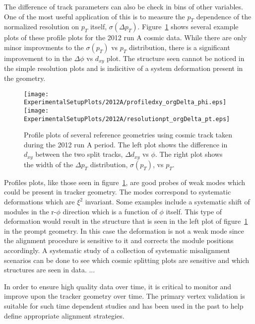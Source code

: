 The difference of track parameters can also be check in bins of other
variables.  One of the most useful application of this is to measure
the $p_T$ dependence of the normalized resolution on $p_T$ itself, 
$\sigma(\Delta p_T)$. Figure~\ref{fig:trackSplittingProfiles} shows 
several example plots of these profile plots for the 2012 run A cosmic 
data.  While there are only minor improvments to the $\sigma(p_T)$ vs
$p_T$ distribution, there is a significant improvement to in the $\Delta\phi$
vs $d_{xy}$ plot.  The structure seen cannot be noticed in the simple
resolution plots and is indicitive of a system deformation present in
the geometry.  

\begin{figure}
\begin{center}
\texttt{[image: ExperimentalSetupPlots/2012A/profiledxy\_orgDelta\_phi.eps]}
\texttt{[image: ExperimentalSetupPlots/2012A/resolutionpt\_orgDelta\_pt.eps]}
\label{fig:trackSplittingProfiles}
\caption{Profile plots of several reference geometries using cosmic track
taken during the 2012 run A period.  The left plot shows the difference 
in $d_{xy}$ between the two split tracks, $\Delta d_{xy}$ vs $\phi$.  The 
right plot shows the width of the $\Delta p_T$ distribution, $\sigma(p_T)$, 
vs $p_T$.}
\end{center}
\end{figure}

Profiles plots, like those seen in figure~\ref{fig:trackSplittingProfiles}, 
are good probes of weak modes which could be present in
tracker geometry.  The modes correspond to systematic deformations which 
are $\xi^2$ invariant.  Some examples include a systematic shift of modules
in the r-$\phi$ direction which is a function of $\phi$ itself.  This 
type of deformation would result in the structure that is seen in the 
left plot of figure~\ref{fig:trackSplittingProfiles} in the prompt geometry.
In this case the deformation is not a weak mode since the alignment 
procedure is sensitive to it and corrects the module positions accordingly.
A systematic study of a collection of systematic misalignment scenarios
can be done to see which cosmic splitting plots are sensitive and which 
structures are seen in data.  ... 



In order to ensure high quality data over time, it 
is critical to monitor and improve upon the tracker geometry over time.  
The primary vertex validation is suitable for such time dependent studies
and has been used in the past to help define appropriate alignment 
strategies. 

